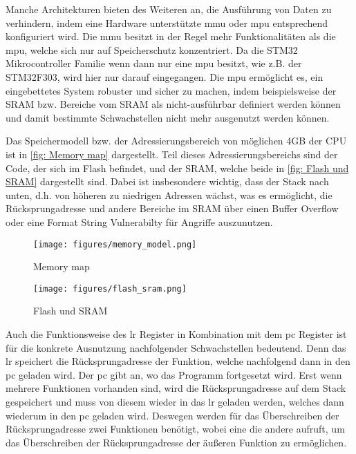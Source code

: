 \documentclass[a4paper,
DIV=13,
12pt,
BCOR=10mm,
department=FakIM,
oneside,
parskip=half,
automark,
listof=totocnumbered,
bibliography=totocnumbered,
acronym=totocnumbered
] {OTHRartcl}
\begin{document}
Manche Architekturen bieten des Weiteren an, die Ausführung von Daten zu verhindern, indem eine Hardware unterstützte \ac{mmu} oder \ac{mpu} entsprechend konfiguriert wird.
Die \ac{mmu} besitzt in der Regel mehr Funktionalitäten als die \ac{mpu}, welche sich nur auf Speicherschutz konzentriert.
Da die STM32 Mikrocontroller Familie wenn dann nur eine \ac{mpu} besitzt, wie z.B. der STM32F303, wird hier nur darauf eingegangen.
Die \ac{mpu} ermöglicht es, ein eingebettetes System robuster und sicher zu machen, indem beispielsweise der SRAM bzw. Bereiche vom SRAM als nicht-ausführbar definiert werden können
und damit bestimmte Schwachstellen nicht mehr ausgenutzt werden können. \cite{MPU}

Das Speichermodell bzw. der Adressierungsbereich von möglichen 4GB der CPU ist in \autoref{fig: Memory map} dargestellt.
Teil dieses Adressierungsbereichs sind der Code, der sich im Flash befindet, und der SRAM, welche beide in \autoref{fig: Flash und SRAM} dargestellt sind.
Dabei ist insbesondere wichtig, dass der Stack nach unten, d.h. von höheren zu niedrigen Adressen wächst, was es ermöglicht,
die Rücksprungadresse und andere Bereiche im SRAM über einen Buffer Overflow oder eine Format String Vulnerabilty für Angriffe auszunutzen. \cite{STM32F103Cx DataSheets}
\begin{figure}[ht!]
  \begin{minipage}[b]{.45\linewidth}
    \texttt{[image: figures/memory\_model.png]}
    \caption{Memory map}
    \label{fig: Memory map}
  \end{minipage}
  \hspace{.1\linewidth}
  \begin{minipage}[b]{.48\linewidth}
    \texttt{[image: figures/flash\_sram.png]}
    \caption{Flash und SRAM}
    \label{fig: Flash und SRAM}
  \end{minipage}
\end{figure}

Auch die Funktionsweise des \ac{lr} Register in Kombination mit dem \ac{pc} Register ist für die konkrete Ausnutzung nachfolgender Schwachstellen bedeutend.
Denn das \ac{lr} speichert die Rücksprungadresse der Funktion, welche nachfolgend dann in den \ac{pc} geladen wird. Der \ac{pc} gibt an, wo das Programm fortgesetzt wird.
Erst wenn mehrere Funktionen vorhanden sind, wird die Rücksprungadresse auf dem Stack gespeichert und muss von
diesem wieder in das \ac{lr} geladen werden, welches dann wiederum in den \ac{pc} geladen wird. \cite{ARM Modell Overview}
Deswegen werden für das Überschreiben der Rücksprungadresse zwei Funktionen benötigt, wobei eine die andere aufruft, um das Überschreiben der Rücksprungadresse der äußeren Funktion zu ermöglichen.
\end{document}
